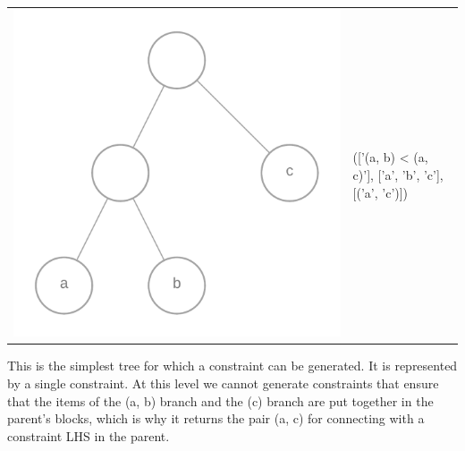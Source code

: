 \documentclass[11pt]{article} %
\begin{document}
\hfill

\begin{center}
\begin{tabular}{>{\centering}m{} >{\centering\arraybackslash}m{}}
	\includegraphics[scale=0.1]{traverse3} & (['(a, b) < (a, c)'], ['a', 'b', 'c'], [('a', 'c')])
\end{tabular}
\end{center}
This is the simplest tree for which a constraint can be generated. It is represented by a single constraint. At this level we cannot generate constraints that ensure that the items of the (a, b) branch and the (c) branch are put together in the parent's blocks, which is why it returns the pair (a, c) for connecting with a constraint LHS in the parent.

\hfill
\end{document}
